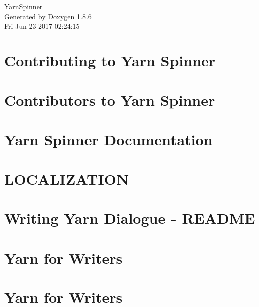 \documentclass[twoside]{book}
\newcommand{\clearemptydoublepage}{%
  \newpage{\pagestyle{empty}\cleardoublepage}%
}
\begin{document}
\hypersetup{pageanchor=false}
\begin{titlepage}
\vspace*{7cm}
\begin{center}%
{\Large Yarn\-Spinner }\\
\vspace*{1cm}
{\large Generated by Doxygen 1.8.6}\\
\vspace*{0.5cm}
{\small Fri Jun 23 2017 02:24:15}\\
\end{center}
\end{titlepage}
\clearemptydoublepage
\tableofcontents
\clearemptydoublepage
{}
\hypersetup{pageanchor=true}

\chapter{Contributing to Yarn Spinner}
\label{a00002}
\hypertarget{a00002}{}

\chapter{Contributors to Yarn Spinner}
\label{a00004}
\hypertarget{a00004}{}

\chapter{Yarn Spinner Documentation}
\label{a00006}
\hypertarget{a00006}{}

\chapter{L\-O\-C\-A\-L\-I\-Z\-A\-T\-I\-O\-N}
\label{a00008}
\hypertarget{a00008}{}

\chapter{Writing Yarn Dialogue -\/ R\-E\-A\-D\-M\-E}
\label{a00010}
\hypertarget{a00010}{}

\chapter{Yarn for Writers}
\label{a00012}
\hypertarget{a00012}{}

\chapter{Yarn for Writers}
\label{a00014}
\hypertarget{a00014}{}

\end{document}
